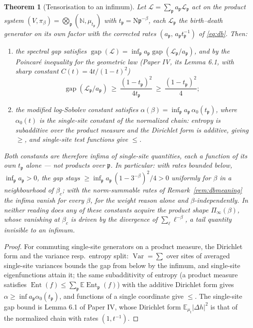 \documentclass[11pt]{amsart}
\numberwithin{equation}{section}
\newtheorem{theorem}{Theorem}[section]
\theoremstyle{definition}
\theoremstyle{remark}
\newcommand{\N}{\mathbb{N}}
\newcommand{\cL}{\mathcal{L}}
\newcommand{\pp}{\mathfrak{p}}
\newcommand{\Ns}{\mathrm{N}}
\begin{document}
\begin{theorem}[Tensorisation to an infimum]\label{thm:tensorise}
Let $\cL=\sum_\pp a_\pp\cL_\pp$ act on the product system $(V,\pi_\beta)=\bigotimes_\pp(\N,\mu_{t_\pp})$
with $t_\pp=\Ns\pp^{-\beta}$, each $\cL_\pp$ the birth--death generator on its own factor
with the corrected rates $(a_\pp,\,a_\pp t_\pp^{-1})$ of \eqref{eq:db}. Then:
\begin{enumerate}
\item the spectral gap satisfies $\operatorname{gap}(\cL)=\inf_{\pp}a_\pp\operatorname{gap}(\cL_\pp/a_\pp)$, and by the
Poincar\'e inequality for the geometric law (Paper IV, its Lemma 6.1, with sharp constant
$C(t)=4t/(1-t)^2$)
\[
\operatorname{gap}(\cL_\pp/a_\pp)\ \ge\ \frac{(1-t_\pp)^2}{4t_\pp}\ \ge\ \frac{(1-t_\pp)^2}{4};
\]
\item the modified log-Sobolev constant satisfies
$\alpha(\beta)=\inf_{\pp}a_\pp\,\alpha_0(t_\pp)$, where $\alpha_0(t)$ is the single-site
constant of the normalized chain: entropy is subadditive over the product measure and the
Dirichlet form is additive, giving $\ge$, and single-site test functions give $\le$.
\end{enumerate}
Both constants are therefore \emph{infima of single-site quantities, each a function of its
own $t_\pp$ alone} --- not products over $\pp$. In particular: with rates bounded below,
$\inf_\pp a_\pp>0$, the gap stays $\ge\inf_\pp a_\pp\,(1-3^{-\beta})^2/4>0$ uniformly for
$\beta$ in a neighbourhood of $\beta_c$; with the norm-summable rates of
Remark~\ref{rem:dbmeaning} the infima vanish for every $\beta$, for the weight reason
alone and $\beta$-independently. In neither reading does any of these constants acquire the
product shape $\Pi_\infty(\beta)$, whose vanishing at $\beta_c$ is driven by the divergence
of $\sum_\ell\ell^{-\beta}$, a tail quantity invisible to an infimum.
\end{theorem}

\begin{proof}
For commuting single-site generators on a product measure, the Dirichlet form and the
variance resp.\ entropy split: $\operatorname{Var}=\sum$ over sites of averaged single-site
variances bounds the gap from below by the infimum, and single-site eigenfunctions attain
it; the same subadditivity of entropy (a product measure satisfies
$\operatorname{Ent}(f)\le\sum_\pp\mathbb E\operatorname{Ent}_\pp(f)$) with the additive
Dirichlet form gives $\alpha\ge\inf a_\pp\alpha_0(t_\pp)$, and functions of a single
coordinate give $\le$. The single-site gap bound is Lemma 6.1 of Paper IV, whose Dirichlet
form $\mathbb E_{\mu_t}|\Delta h|^2$ is that of the normalized chain with rates $(1,t^{-1})$.
\end{proof}
\end{document}
